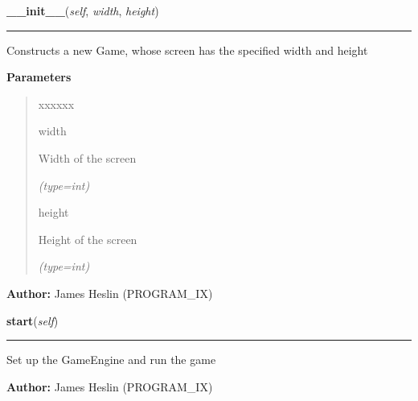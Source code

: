 \hspace{.8\funcindent}\begin{boxedminipage}{\funcwidth}

    \raggedright \textbf{\_\_init\_\_}(\textit{self}, \textit{width}, \textit{height})

    \vspace{-1.5ex}

    \rule{\textwidth}{0.5\fboxrule}
\setlength{\parskip}{2ex}
    Constructs a new Game, whose screen has the specified width and height

\setlength{\parskip}{1ex}
      \textbf{Parameters}
      \vspace{-1ex}

      \begin{quote}
        \begin{Ventry}{xxxxxx}

          \item[width]

          Width of the screen

            {\it (type=int)}

          \item[height]

          Height of the screen

            {\it (type=int)}

        \end{Ventry}

      \end{quote}

\textbf{Author:} James Heslin (PROGRAM\_IX)



    \end{boxedminipage}

    \label{pystroke:game:Game:start}

    \vspace{0.5ex}

\hspace{.8\funcindent}\begin{boxedminipage}{\funcwidth}

    \raggedright \textbf{start}(\textit{self})

    \vspace{-1.5ex}

    \rule{\textwidth}{0.5\fboxrule}
\setlength{\parskip}{2ex}
    Set up the GameEngine and run the game

\setlength{\parskip}{1ex}
\textbf{Author:} James Heslin (PROGRAM\_IX)



    \end{boxedminipage}

